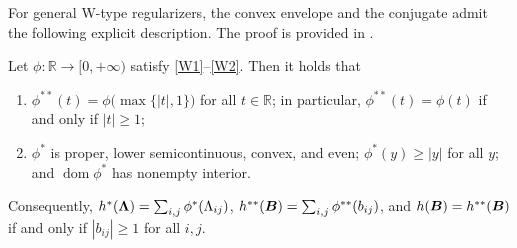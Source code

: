 For general W-type regularizers, the convex envelope and the conjugate admit the following explicit description. The proof is provided in .
\begin{lemma}\label{lem:wtype-conj}
Let \(\phi:\mathbb{R}\to[0,+\infty)\) satisfy \ref{W1}--\ref{W2}. Then it holds that
\begin{enumerate}[label=\textup{(\alph*)}]
\item \(\phi^{**}(t)=\phi\bigl(\max\{|t|,1\}\bigr)\) for all \(t\in\mathbb{R}\); in particular, \(\phi^{**}(t)=\phi(t)\) if and only if \(|t|\ge1\);
\item \(\phi^*\) is proper, lower semicontinuous, convex, and even; \(\phi^*(y)\ge|y|\) for all \(y\); and \(\operatorname{dom}\phi^*\) has nonempty interior.
\end{enumerate}
Consequently, \(h^*(\bm{\Lambda})=\sum_{i,j}\phi^*(\Lambda_{ij})\), \(h^{**}(\bm{B})=\sum_{i,j}\phi^{**}(b_{ij})\), and \(h(\bm{B})=h^{**}(\bm{B})\) if and only if \(|b_{ij}|\ge1\) for all \(i,j\).
\end{lemma}

\endgroup


